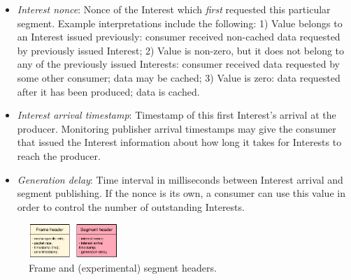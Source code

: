 \documentclass{icn/sig-alternate-2013} %
\begin{document}
\begin{itemize} [label={}]
\item \textit{Interest nonce}: Nonce of the Interest which \textit{first} requested this particular segment. Example interpretations include the following:  1) Value belongs to an Interest issued previously: consumer received non-cached data requested by previously issued Interest; 2) Value is non-zero, but it does not belong to any of the previously issued Interests:  consumer received data requested by some other consumer; data may be cached; 3) Value is zero: data requested after it has been produced; data is cached.
\item \textit{Interest arrival timestamp}: Timestamp of this first Interest's arrival at the producer. Monitoring publisher arrival timestamps may give the consumer that issued the Interest information about how long it takes for Interests to reach the producer. %
\item \textit{Generation delay}: Time interval in milliseconds between Interest arrival and segment publishing. If the nonce is its own, a consumer can use this value in order to control the number of outstanding Interests. %
\end{itemize}



%

%


\begin{figure}[t!]
\centering
\includegraphics[width=0.3\textwidth]{data-struct}
\vspace{-4pt}
\caption{Frame and (experimental) segment headers.}
\label{fig:data-struct}
\end{figure}
\end{document}
